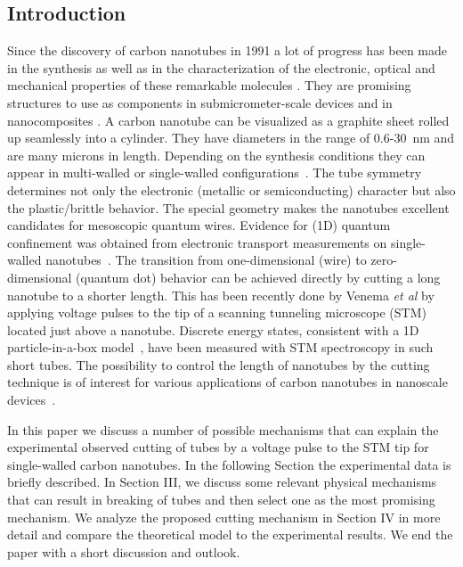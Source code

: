 
\begin{multicols}{2}
\narrowtext

\section{Introduction}

Since the discovery of carbon nanotubes in 1991 \cite{Iijima} a
lot of progress has been made in the synthesis as well as in the
characterization of the electronic, optical and mechanical
properties of these remarkable molecules
\cite{book,book1,book2,dekker_pt}. They are promising structures
to use as components in submicrometer-scale devices
\cite{devices,pipe} and in nanocomposites \cite{nanoc}. A carbon
nanotube can be visualized as a graphite sheet rolled up
seamlessly into a cylinder. They have diameters in the range of
0.6-30~nm and are many microns in length. Depending on the
synthesis conditions they can appear in multi-walled or
single-walled configurations~\cite{Iijima,Smalley,Catherine}. The
tube symmetry determines not only the electronic (metallic or
semiconducting) character\cite{book2} but also the plastic/brittle
behavior\cite{Marco,Paul}. The special geometry makes the
nanotubes excellent candidates for mesoscopic quantum wires.
Evidence for (1D) quantum confinement was obtained from electronic
transport measurements on single-walled nanotubes~\cite{Dekker}.
The transition from one-dimensional (wire) to zero-dimensional
(quantum dot) behavior can be achieved directly by cutting a long
nanotube to a shorter length. This has been recently done by
Venema {\it et al}\cite{Venema} by applying voltage pulses to the
tip of a scanning tunneling microscope (STM) located just above a
nanotube. Discrete energy states, consistent with a 1D
particle-in-a-box model~\cite{Venema2,Rubio}, have been measured
with STM spectroscopy in such short tubes\cite{Venema2}. The
possibility to control the length of nanotubes by the cutting
technique is of interest for various applications of carbon
nanotubes in nanoscale devices~\cite{dekker_pt,devices}.

In this paper we discuss a number of possible mechanisms that can
explain the experimental observed cutting of tubes by a voltage
pulse to the STM tip for single-walled carbon nanotubes. In the
following Section the experimental data is briefly described. In
Section III, we discuss some relevant physical mechanisms that can
result in breaking of tubes and then select one as the most
promising mechanism. We analyze the proposed cutting mechanism in
Section IV in more detail and compare the theoretical model to the
experimental results. We end the paper with a short discussion and
outlook.


\end{multicols}

